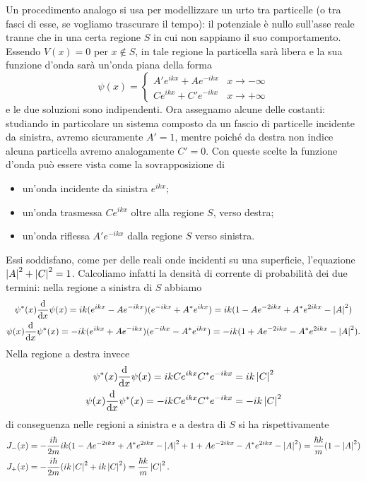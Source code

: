 Un procedimento analogo si usa per modellizzare un urto tra particelle (o tra fasci di esse, se vogliamo trascurare il tempo): il potenziale è nullo sull'asse reale tranne che in una certa regione $S$ in cui non sappiamo il suo comportamento.
Essendo $V(x)=0$ per $x\notin S$, in tale regione la particella sarà libera e la sua funzione d'onda sarà un'onda piana della forma
\begin{equation}
	\psi(x)=
	\begin{cases}
		A'e^{ikx}+Ae^{-ikx}	&x\to-\infty\\
		Ce^{ikx}+C'e^{-ikx}	&x\to+\infty
	\end{cases}
\end{equation}
e le due soluzioni sono indipendenti.
Ora assegnamo alcune delle costanti: studiando in particolare un sistema composto da un fascio di particelle incidente da sinistra, avremo sicuramente $A'=1$, mentre poich\'e da destra non indice alcuna particella avremo analogamente $C'=0$.
Con queste scelte la funzione d'onda può essere vista come la sovrapposizione di
\begin{itemize}
	\item un'onda incidente da sinistra $e^{ikx}$;
	\item un'onda trasmessa $Ce^{ikx}$ oltre alla regione $S$, verso destra;
	\item un'onda riflessa $A'e^{-ikx}$ dalla regione $S$ verso sinistra.
\end{itemize}
Essi soddisfano, come per delle reali onde incidenti su una superficie, l'equazione $\left|{A}\right|^2+\left|{C}\right|^2=1$.
Calcoliamo infatti la densità di corrente di probabilità dei due termini: nella regione a sinistra di $S$ abbiamo
\begin{gather*}
	\psi^*(x)\frac{\textup{d} {}}{\textup{d} {x}}\psi(x)=ik(e^{ikx}-Ae^{-ikx})(e^{-ikx}+A^*e^{ikx})=ik(1-Ae^{-2ikx}+A^*e^{2ikx}-\left|{A}\right|^2)\\
	\psi(x)\frac{\textup{d} {}}{\textup{d} {x}}\psi^*(x)=-ik(e^{ikx}+Ae^{-ikx})(e^{-ikx}-A^*e^{ikx})=-ik(1+Ae^{-2ikx}-A^*e^{2ikx}-\left|{A}\right|^2).
\end{gather*}
Nella regione a destra invece
\begin{gather*}
	\psi^*(x)\frac{\textup{d} {}}{\textup{d} {x}}\psi(x)=ikCe^{ikx}C^*e^{-ikx}=ik\left|{C}\right|^2\\
	\psi(x)\frac{\textup{d} {}}{\textup{d} {x}}\psi^*(x)=-ikCe^{ikx}C^*e^{-ikx}=-ik\left|{C}\right|^2
\end{gather*}
di conseguenza nelle regioni a sinistra e a destra di $S$ si ha rispettivamente
\begin{equation}
	\begin{aligned}
		J_-(x)&=-\frac{i\hbar}{2m}ik(1-Ae^{-2ikx}+A^*e^{2ikx}-\left|{A}\right|^2+1+Ae^{-2ikx}-A^*e^{2ikx}-\left|{A}\right|^2)=\frac{\hbar k}{m}(1-\left|{A}\right|^2)\\
		J_+(x)&=-\frac{i\hbar}{2m}(ik\left|{C}\right|^2+ik\left|{C}\right|^2)=\frac{\hbar k}{m}\left|{C}\right|^2.
	\end{aligned}
\end{equation}
